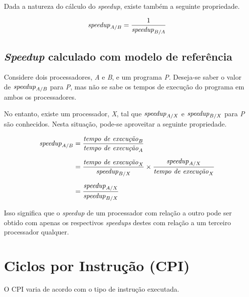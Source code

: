\documentclass[12pt]{article}
\newcommand{\Text}[1]{\textrm{\textit{#1}}}
\begin{document}
Dada a natureza do cálculo do \textit{speedup}, existe também a seguinte propriedade.

\[ \Text{speedup}_{A/B} = \frac{1}{\Text{speedup}_{B/A}} \]


\subsection{\textit{Speedup} calculado com modelo de referência}

Considere dois processadores, \emph{A} e \emph{B}, e um programa \emph{P}. Deseja-se saber o valor de \( \Text{speedup}_{A/B} \) para \emph{P}, mas não se sabe os tempos de execução do programa em ambos os processadores.

No entanto, existe um processador, \emph{X}, tal que \( \Text{speedup}_{A/X} \) e \( \Text{speedup}_{B/X} \) para \emph{P} são conhecidos. Nesta situação, pode-se aproveitar a seguinte propriedade.

\begin{align*}
  \Text{speedup}_{A/B}
  &= \frac{\Text{tempo de execução}_B}{\Text{tempo de execução}_A} \\[\medskipamount]
  &= \frac{\Text{tempo de execução}_X}{\Text{speedup}_{B/X}} \times
     \frac{\Text{speedup}_{A/X}}{\Text{tempo de execução}_X}\\[\medskipamount]
  &= \frac{\Text{speedup}_{A/X}}{\Text{speedup}_{B/X}}
\end{align*}


Isso significa que o \textit{speedup} de um processador com relação a outro pode ser obtido com apenas os respectivos \textit{speedups} destes com relação a um terceiro processador qualquer.


\section{Ciclos por Instrução (CPI)}


\begin{tcolorbox}[title=Lembre-se]
  O CPI varia de acordo com o tipo de instrução executada.
\end{tcolorbox}
\end{document}
